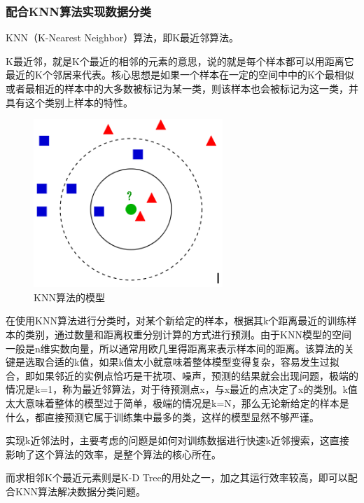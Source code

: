 \documentclass{article}
\begin{document}
\subsubsection{配合KNN算法实现数据分类}
KNN（K-Nearest Neighbor）算法，即K最近邻算法。\par
K最近邻，就是K个最近的相邻的元素的意思，说的就是每个样本都可以用距离它最近的K个邻居来代表。核心思想是如果一个样本在一定的空间中中的K个最相似或者最相近的样本中的大多数被标记为某一类，则该样本也会被标记为这一类，并具有这个类别上样本的特性。
\newpage
\begin{figure}[h!]
    \centering
    \includegraphics[scale=0.5]{KNN}
    \caption{KNN算法的模型}
    \label{fig:KNN}
\end{figure} \par
在使用KNN算法进行分类时，对某个新给定的样本，根据其k个距离最近的训练样本的类别，通过数量和距离权重分别计算的方式进行预测。由于KNN模型的空间一般是n维实数向量，所以通常用欧几里得距离来表示样本间的距离。该算法的关键是选取合适的k值，如果k值太小就意味着整体模型变得复杂，容易发生过拟合，即如果邻近的实例点恰巧是干扰项、噪声，预测的结果就会出现问题，极端的情况是k=1，称为最近邻算法，对于待预测点x，与x最近的点决定了x的类别。k值太大意味着整体的模型过于简单，极端的情况是k=N，那么无论新给定的样本是什么，都直接预测它属于训练集中最多的类，这样的模型显然不够严谨。\par
实现k近邻法时，主要考虑的问题是如何对训练数据进行快速k近邻搜索，这直接影响了这个算法的效率，是整个算法的核心所在。\par
而求相邻K个最近元素则是K-D Tree的用处之一，加之其运行效率较高，即可以配合KNN算法解决数据分类问题。
\end{document}

